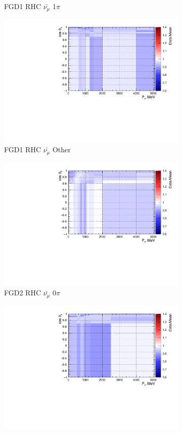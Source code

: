 \begin{figure}
\begin{subfigure}{.32\textwidth}
  \caption{FGD1 RHC $\bar{\nu_{\mu}}$ 1$\pi$}
  \label{fig:priorpred_FGD1_anti-numuCC_1pi}
\end{subfigure}
\begin{subfigure}{.32\textwidth}
  \centering
  \includegraphics[width=0.85\linewidth]{figs/priorpred_FGD1_anti-numuCC_other.pdf}
  \caption{FGD1 RHC $\bar{\nu_{\mu}}$ Other}
  \label{fig:priorpred_FGD1_anti-numuCC_other}
\end{subfigure}
\centering
\begin{subfigure}{.32\textwidth}
  \centering
  \includegraphics[width=0.85\linewidth]{figs/priorpred_FGD2_anti-numuCC_0pi.pdf}
  \caption{FGD2 RHC $\bar{\nu_{\mu}}$ 0$\pi$}
  \label{fig:priorpred_FGD2_anti-numuCC_0pi}
\end{subfigure}
\begin{subfigure}{.32\textwidth}
  \centering
  \includegraphics[width=0.85\linewidth]{figs/priorpred_FGD2_anti-numuCC_1pi.pdf}

\end{subfigure}
\end{figure}
